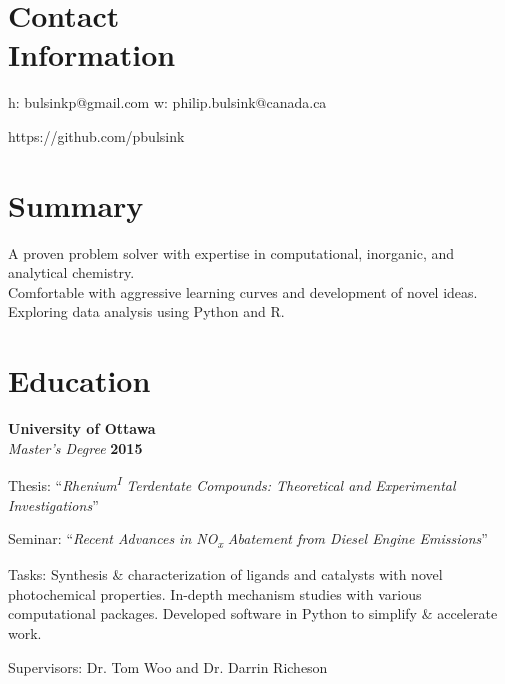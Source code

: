 \documentclass[margin,line]{resume}
\begin{document}
\thispagestyle{plain}
\begin{resume}

    \section{\mysidestyle Contact\\Information}
        
    h: bulsinkp@gmail.com \hspace{60mm} w: philip.bulsink@canada.ca
\vspace{-4.5mm}
    
    https://github.com/pbulsink
    \\\vspace{-4.5mm}


    \section{\mysidestyle Summary}

    A proven problem solver with expertise in computational, inorganic, and analytical chemistry.\\ Comfortable with aggressive learning curves and development of novel ideas.\\ Exploring data analysis using Python and R.


    \section{\mysidestyle Education}

    \textbf{University of Ottawa}\\\vspace{1mm}%
    \textsl{Master's Degree} \hfill \textbf{2015}\vspace{-3mm}\\\vspace{-1mm}%
    \begin{list2}
        \item Thesis: ``\textit{Rhenium\textsuperscript{I} Terdentate Compounds: Theoretical and Experimental Investigations}''
        \item Seminar: ``\textit{Recent Advances in NO\textsubscript{x} Abatement from Diesel Engine Emissions}''
        \item Tasks: Synthesis \& characterization of ligands and catalysts with novel photochemical properties. In-depth mechanism studies with various computational packages. Developed software in Python to simplify \& accelerate work.
        \item Supervisors: Dr. Tom Woo and Dr. Darrin Richeson
    \end{list2}


\end{resume}
\end{document}
